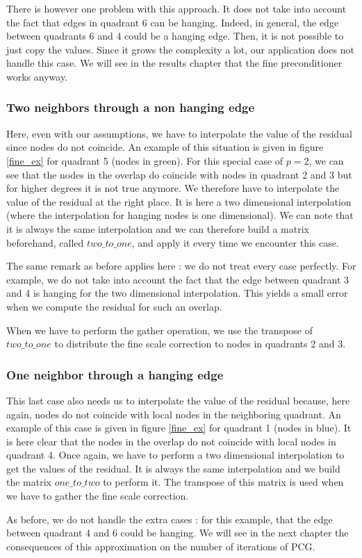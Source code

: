 There is however one problem with this approach. It does not take into account the fact that edges in quadrant 6 can be hanging. Indeed, in general, the edge between quadrants 6 and 4 could be a hanging edge. Then, it is not possible to just copy the values. Since it grows the complexity a lot, our application does not handle this case. We will see in the results chapter that the fine preconditioner works anyway. 

\subsubsection{Two neighbors through a non hanging edge}

Here, even with our assumptions, we have to interpolate the value of the residual since nodes do not coincide. An example of this situation is given in figure \ref{fine_ex} for quadrant 5 (nodes in green). For this special case of $p=2$, we can see that the nodes in the overlap do coincide with nodes in quadrant 2 and 3 but for higher degrees it is not true anymore. We therefore have to interpolate the value of the residual at the right place. It is here a two dimensional interpolation (where the interpolation for hanging nodes is one dimensional). We can note that it is always the same interpolation and we can therefore build a matrix beforehand, called $two\_to\_one$, and apply it every time we encounter this case. 

The same remark as before applies here : we do not treat every case perfectly. For example, we do not take into account the fact that the edge between quadrant 3 and 4 is hanging for the two dimensional interpolation. This yields a small error when we compute the residual for such an overlap. 

When we have to perform the gather operation, we use the transpose of $two\_to\_one$ to distribute the fine scale correction to nodes in quadrants 2 and 3. 

\subsubsection{One neighbor through a hanging edge}

This last case also needs us to interpolate the value of the residual because, here again, nodes do not coincide with local nodes in the neighboring quadrant. An example of this case is given in figure \ref{fine_ex} for quadrant 1 (nodes in blue). It is here clear that the nodes in the overlap do not coincide with local nodes in quadrant 4. Once again, we have to perform a two dimensional interpolation to get the values of the residual. It is always the same interpolation and we build the matrix $one\_to\_two$ to perform it. The transpose of this matrix is used when we have to gather the fine scale correction.

 As before, we do not handle the extra cases : for this example, that the edge between quadrant 4 and 6 could be hanging. We will see in the next chapter the consequences of this approximation on the number of iterations of PCG.

